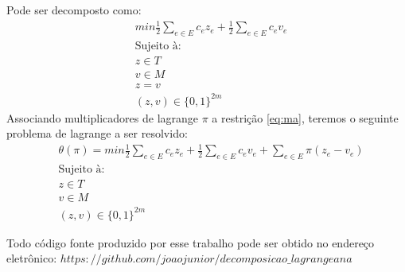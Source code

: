 \documentclass{proc}
\begin{document}
Pode ser decomposto como:
\begin{align}
    & min \frac{1}{2}\sum_{e \in E} c_ez_e +  \frac{1}{2}\sum_{e \in E} c_ev_e\label{eq:objetivodecomposto}  \\
    & \text{Sujeito à:} \nonumber \\
    & z \in T \label{eq:arvored} \\
    & v \in M \label{eq:matchingd} \\
    & z = v \label{eq:ma} \\
    & (z,v) \in \{0,1\}^{2m} \label{eq:2m}
\end{align}
Associando multiplicadores de lagrange $\pi$ a restrição \eqref{eq:ma}, teremos o seguinte problema de lagrange a ser resolvido:
\begin{align}
    & \theta(\pi) = min \frac{1}{2}\sum_{e \in E} c_ez_e +  \frac{1}{2}\sum_{e \in E} c_ev_e + \sum_{e \in E} \pi(z_e - v_e) \label{eq:objetivodecomposto1}  \\
    & \text{Sujeito à:} \nonumber \\
    & z \in T \label{eq:arvored1} \\
    & v \in M \label{eq:matchingd1} \\
    & (z,v) \in \{0,1\}^{2m} \label{eq:2m1}
\end{align}




Todo código fonte produzido por esse trabalho pode ser obtido no endereço eletrônico: $https://github.com/joaojunior/decomposicao\_lagrangeana$



\end{document}
